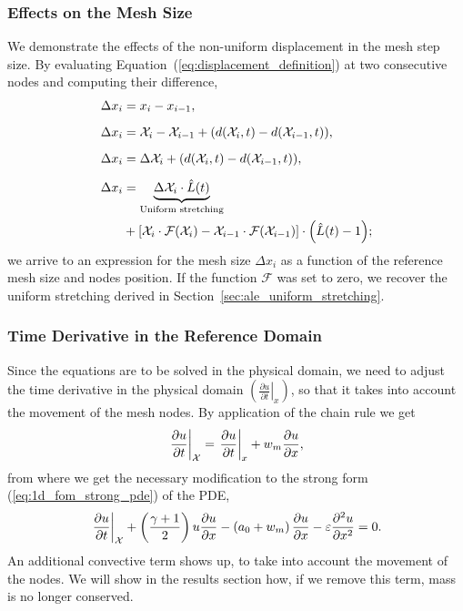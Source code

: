 \documentclass[../../thesis.tex]{subfiles}
\newcommand{\aleX}{\ensuremath{\mathcal{X}}}
\begin{document}
\subsubsection*{Effects on the Mesh Size}
We demonstrate the effects of the non-uniform displacement in the mesh step size.
By evaluating Equation~(\ref{eq:displacement_definition}) at two consecutive nodes
and computing their difference,
\begin{subequations}    
\begin{align}
    \Delta x_i &= x_i - x_{i-1},
    \\[2mm]
    \Delta x_i &= \aleX_i - \aleX_{i-1} + \qty(d\qty(\aleX_i, t) - d\qty(\aleX_{i-1}, t)),
    \\[2mm]
    \Delta x_i &= \Delta \aleX_i + \qty(d\qty(\aleX_i, t) - d\qty(\aleX_{i-1}, t)),
    \\[2mm]
    \Delta x_i &= 
    \underbrace{\Delta \aleX_i \cdot \hat{L}(t)}_{\text{Uniform stretching}}
    \nonumber\\
    &+\qty[\aleX_i \cdot \mathcal{F}\qty(\aleX_i)
    - \aleX_{i-1} \cdot \mathcal{F}\qty(\aleX_{i-1})] \cdot \qty(\hat{L}(t) - 1);
    \end{align}
\end{subequations}
we arrive to an expression for the mesh size $\Delta x_i$ 
as a function of the reference mesh size and nodes position.
If the function $\mathcal{F}$ was set to zero, 
we recover the uniform stretching derived in Section~\ref{sec:ale_uniform_stretching}.

\subsubsection{Time Derivative in the Reference Domain}
Since the equations are to be solved in the physical domain, 
we need to adjust the time derivative in the physical domain 
$\left(\left.\frac{\partial u}{\partial t}\right|_{x}\right)$, 
so that it takes into account the movement of the mesh nodes.
By application of the chain rule we get
\begin{equation}
    \left.\frac{\partial u}{\partial t}\right|_{\aleX} = 
    \left.\frac{\partial u}{\partial t}\right|_{x} + w_m \pdv{u}{x},
\end{equation}
from where we get the necessary modification to the strong form (\ref{eq:1d_fom_strong_pde}) of the PDE, 
\begin{equation}
    \left.\frac{\partial u}{\partial t}\right|_{\aleX} 
    + \left(\frac{\gamma+1}{2}\right) u \frac{\partial u}{\partial x} 
    - \left(a_0 + w_m\right)\frac{\partial u}{\partial x} 
    - \varepsilon \pdv[2]{u}{x} = 0.
\end{equation}
An additional convective term shows up, to take into account the movement of the nodes.
We will show in the results section how, if we remove this term, mass is no longer conserved.
\end{document}
